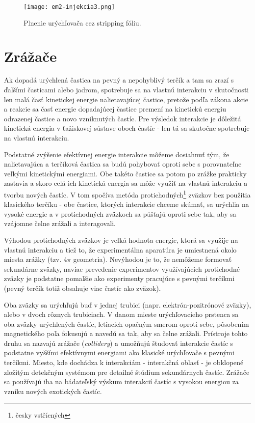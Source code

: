 \documentclass[../../main.tex]{subfiles}
\begin{document}
\begin{figure}[h]
\centering
\texttt{[image: em2-injekcia3.png]}
\caption{Plnenie urýchľovača cez stripping fóliu.}
\label{em2:img:injekcia3}
\end{figure}

\section{Zrážače}

Ak dopadá urýchlená častica na pevný a nepohyblivý terčík a tam sa zrazí s ďalšími časticami alebo jadrom, spotrebuje sa na vlastnú interakciu v skutočnosti len malá časť kinetickej energie nalietavajúcej častice, pretože podľa zákona akcie a reakcie sa časť energie dopadajúcej častice premení na kinetickú energiu odrazenej častice a novo vzniknutých častíc. Pre výsledok interakcie je dôležitá kinetická energia v ťažiskovej sústave oboch častíc - len tá sa skutočne spotrebuje na vlastnú interakciu.

Podstatné zvýšenie efektívnej energie interakcie môžeme dosiahnuť tým, že nalietavajúca a terčíková častica sa budú pohybovať oproti sebe s porovnateľne veľkými kinetickými energiami. Obe takéto častice sa potom po zrážke prakticky zastavia a skoro celá ich kinetická energia sa môže využiť na vlastnú interakciu a tvorbu nových častíc. V tom spočíva metóda protichodných\footnote{česky vstřícných} zväzkov bez použitia klasického terčíku - obe častice, ktorých interakcie chceme skúmať, sa urýchlia na vysoké energie a v protichodných zväzkoch sa púšťajú oproti sebe tak, aby sa vzájomne čelne zrážali a interagovali.

Výhodou protichodných zväzkov je veľká hodnota energie, ktorá sa využije na vlastnú interakciu a tiež to, že experimentálna aparatúra je umiestnená okolo miesta zrážky (tzv. 4$\pi$ geometria). Nevýhodou je to, že nemôžeme formovať sekundárne zväzky, naviac prevedenie experimentov využívajúcich protichodné zväzky je podstatne pomalšie ako experimenty pracujúce s pevnými terčíkmi (pevný terčík totiž obsahuje viac častíc ako zväzok).

Oba zväzky sa urýchľujú buď v jednej trubici (napr. elektrón-pozitrónové zväzky), alebo v dvoch rôznych trubiciach. V danom mieste urýchľovacieho prstenca sa oba zväzky urýchlených častíc, letiacich opačným smerom oproti sebe, pôsobením magnetického poľa fokusujú a navedú sa tak, aby sa čelne zrážali. Prístroje tohto druhu sa nazvajú zrážače (\textit{collidery}) a umožňujú študovať interakcie častíc s podstatne vyššími efektívnymi energiami ako klasické urýchľovače s pevnými terčíkmi. Miesto, kde dochádza k interakciám - interakčná oblasť - je obklopené zložitým detekčným systémom pre detailné štúdium sekundárnych častíc. Zrážače sa používajú iba na bádateľský výskum interakcií častíc s vysokou energiou za vzniku nových exotických častíc.   
\end{document}
